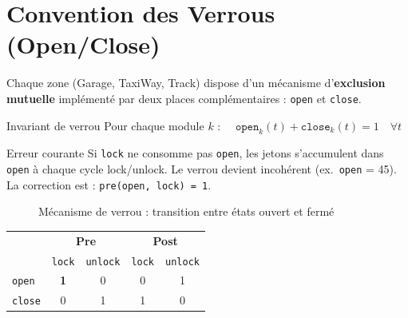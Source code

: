\documentclass[a4paper,12pt]{article}
\begin{document}
\newpage
\section{Convention des Verrous (Open/Close)}

Chaque zone (Garage, TaxiWay, Track) dispose d'un mécanisme d'\textbf{exclusion mutuelle}
implémenté par deux places complémentaires : \texttt{open} et \texttt{close}.

\begin{defbox}{Invariant de verrou}
Pour chaque module $k$ : $\quad \texttt{open}_k(t) + \texttt{close}_k(t) = 1 \quad \forall t$
\end{defbox}

\begin{warnbox}{Erreur courante}
Si \texttt{lock} ne consomme pas \texttt{open}, les jetons s'accumulent dans
\texttt{open} à chaque cycle lock/unlock. Le verrou devient incohérent
(ex.\ \texttt{open} = 45). La correction est : \texttt{pre(open, lock) = 1}.
\end{warnbox}

\begin{figure}[H]
\centering
{}
\caption{Mécanisme de verrou : transition entre états ouvert et fermé}
\end{figure}

\begin{center}
\begin{tabular}{l|cc|cc}
\toprule
 & \multicolumn{2}{c|}{\textbf{Pre}} & \multicolumn{2}{c}{\textbf{Post}} \\
 & \texttt{lock} & \texttt{unlock} & \texttt{lock} & \texttt{unlock} \\
\midrule
\texttt{open}  & \textbf{1} & 0 & 0 & 1 \\
\texttt{close} & 0          & 1 & 1 & 0 \\
\bottomrule
\end{tabular}
\end{center}
\end{document}
